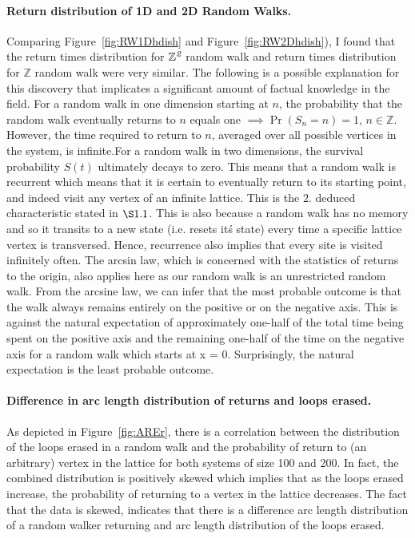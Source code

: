 \documentclass{article}
\begin{document}
\paragraph{Return distribution of 1D and 2D Random Walks.} Comparing Figure~\ref{fig:RW1Dhdish} and Figure~\ref{fig:RW2Dhdish}), I found that the return times distribution for $\mathbb{Z}^{\emph{2}}$ random walk and return times distribution for $\mathbb{Z}$ random walk were very similar. The following is a possible explanation for this discovery that implicates a significant amount of factual knowledge in the field. For a random walk in one dimension starting at $n$, the probability that the random walk eventually returns to $n$ equals one \cite{Redner2002} $\implies \Pr(S_{n}=n) = 1$, $n \in \mathbb{Z}$. However, the time required to return to $n$, averaged over all possible vertices in the system, is infinite.For a random walk in two dimensions, the survival probability $S(t)$ ultimately decays to zero. This means that a random walk is recurrent which means that it is certain to eventually return to its starting point, and indeed visit any vertex of an infinite lattice. This is the $2.$ deduced characteristic stated in $\S1.1$.  This is also because a random walk has no memory and so it transits to a new state (i.e. resets it\' s state) every time a specific lattice vertex is transversed. Hence, recurrence also implies that every site is visited infinitely often.
The arcsin law, which is concerned with the statistics of returns to the origin, also applies here as our random walk is an unrestricted random walk. From the arcsine law, we can infer that the most probable outcome is that the walk always remains entirely on the positive or on the negative axis. This is against the natural expectation of approximately one-half of the total time being spent on the positive axis and the remaining one-half of the time on the negative axis for a random walk which starts at x = 0. Surprisingly, the natural expectation is the least probable outcome.
\paragraph{Difference in arc length distribution of returns and loops erased.} As depicted in Figure~\ref{fig:AREr}, there is a correlation between the distribution of the loops erased in a random walk and the probability of return to (an arbitrary) vertex in the lattice for both systems of size 100 and 200. In fact, the combined distribution is positively skewed which implies that as the loops erased increase, the probability of returning to a vertex in the lattice decreases. The fact that the data is skewed, indicates that there is a difference arc length distribution of a random walker returning and arc length distribution of the loops erased.
\newpage
\end{document}
